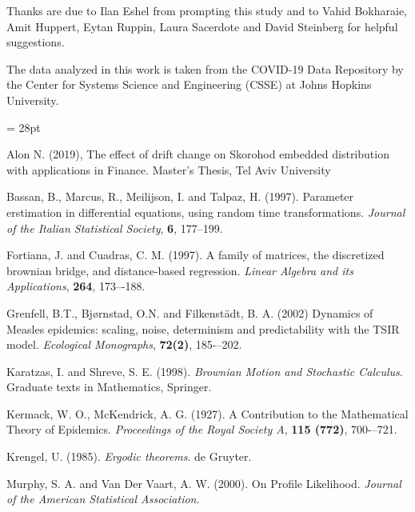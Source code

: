 \documentclass{article}
\begin{document}
Thanks are due to Ilan Eshel from prompting this study and to Vahid
Bokharaie, Amit Huppert, Eytan Ruppin, Laura Sacerdote and David Steinberg for helpful suggestions.

The data analyzed in this work is taken from the COVID-19 Data Repository by
the Center for Systems Science and Engineering (CSSE) at Johns Hopkins
University.


\baselineskip= 28pt

\begin{thebibliography}{99}

 Alon N. (2019), The effect of drift change on Skorohod embedded
distribution with applications in Finance. Master’s Thesis, Tel Aviv
University

 Bassan, B., Marcus, R., Meilijson, I. and Talpaz, H. (1997). Parameter erstimation in differential equations, using random time transformations. {\em Journal of the Italian Statistical Society}, {\bf 6}, 177--199.

 Fortiana, J. and Cuadras, C. M. (1997). A family of matrices, the
discretized brownian bridge, and distance-based regression. {\em Linear
Algebra and its Applications}, {\bf 264}, 173–-188.

 Grenfell, B.T., Bj{\o}rnstad, O.N. and Filkenst\"{a}dt, B. A. (2002) Dynamics of Measles epidemics: scaling, noise, determinism and predictability with the TSIR model. {\em Ecological Monographs}, {\bf 72(2)}, 185-–202.

 Karatzas, I. and Shreve, S. E. (1998). {\em Brownian Motion and Stochastic Calculus}. Graduate texts in Mathematics, Springer.

  Kermack, W. O., McKendrick, A. G. (1927). A Contribution to the Mathematical Theory of Epidemics. {\em Proceedings of the Royal Society A}, {\bf 115 (772)}, 700-–721.

 Krengel, U. (1985). {\em Ergodic theorems}. de Gruyter.

 Murphy, S. A. and  Van Der Vaart, A. W. (2000). On Profile Likelihood. {\em Journal of the American Statistical Association}.
\end{thebibliography}
\end{document}
